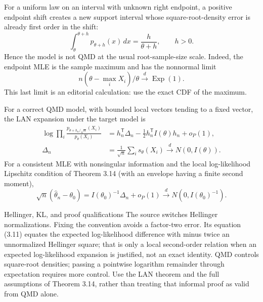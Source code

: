 \documentclass[12pt]{article}
\begin{document}
For a uniform law on an interval with unknown right endpoint, a positive
endpoint shift creates a new support interval whose square-root-density
error is already first order in the shift:
\begin{equation}
 \int_\theta^{\theta+h}p_{\theta+h}(x)\,dx
 =\frac{h}{\theta+h},\qquad h>0.
\end{equation}
Hence the model is not QMD at the usual root-sample-size scale. Indeed,
the endpoint MLE is the sample maximum and has the nonnormal limit
\begin{equation}
 n(\theta-\max_iX_i)/\theta\xrightarrow{d}\operatorname{Exp}(1).
\end{equation}
This last limit is an editorial calculation: use the exact CDF of the maximum.

For a correct QMD model, with bounded local vectors tending to a fixed
vector, the LAN expansion under the target model is
\begin{align}
 \log\prod_i\frac{p_{\theta+h_n/\sqrt n}(X_i)}{p_\theta(X_i)}
 &=h_n^{\mathsf T}\Delta_n-\tfrac12h_n^{\mathsf T}I(\theta)h_n+o_P(1),\\
 \Delta_n&=\frac1{\sqrt n}\sum_i s_\theta(X_i)
 \xrightarrow{d}N(0,I(\theta)).
\end{align}
For a consistent MLE with nonsingular information and the local
log-likelihood Lipschitz condition of Theorem 3.14 (with an envelope having
a finite second moment),
\begin{equation}
 \sqrt n(\widehat\theta_n-\theta_0)
 =I(\theta_0)^{-1}\Delta_n+o_P(1)
 \xrightarrow{d}N(0,I(\theta_0)^{-1}).
\end{equation}
\begin{correctionbox}{Hellinger, KL, and proof qualifications}
The source switches Hellinger normalizations. Fixing the convention avoids
a factor-two error. Its equation (3.11) equates the expected log-likelihood
difference with minus twice an unnormalized Hellinger square; that is only
a local second-order relation when an expected log-likelihood expansion
is justified, not an exact identity. QMD controls square-root densities;
passing a pointwise logarithm remainder through expectation requires more
control. Use the LAN theorem and the full assumptions of Theorem 3.14,
rather than treating that informal proof as valid from QMD alone.
\end{correctionbox}
\end{document}
